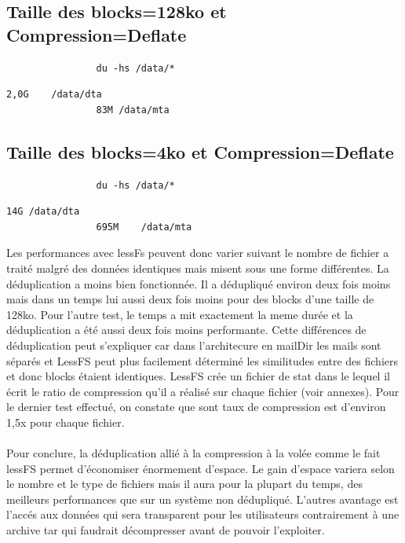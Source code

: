 \documentclass[a4paper]{report}
\begin{document}
			\subsection{Taille des blocks=128ko et Compression=Deflate}
			\begin{lstlisting}
				du -hs /data/*
			\end{lstlisting}
			\begin{lstlisting}[backgroundcolor=\color{yellow}]
				2,0G	/data/dta
				83M	/data/mta
			\end{lstlisting}
			\subsection{Taille des blocks=4ko et Compression=Deflate}
			\begin{lstlisting}
				du -hs /data/*
			\end{lstlisting}
			\begin{lstlisting}[backgroundcolor=\color{yellow}]
				14G	/data/dta
				695M	/data/mta
			\end{lstlisting}
			
			Les performances avec lessFs peuvent donc varier suivant le nombre de fichier a traité malgré des données identiques mais misent sous une forme différentes. La déduplication a moins bien fonctionnée. Il a dédupliqué environ deux fois moins mais dans un temps lui aussi deux fois moins pour des blocks d'une taille de 128ko. Pour l'autre test, le temps a mit exactement la meme durée et la déduplication a été aussi deux fois moins performante. Cette différences de déduplication peut s'expliquer car dans l'architecure en mailDir les mails sont séparés et LessFS peut plus facilement déterminé les similitudes entre des fichiers et donc blocks étaient identiques. LessFS crée un fichier de stat dans le lequel il écrit le ratio de compression qu'il a réalisé sur chaque fichier (voir annexes). Pour le  dernier test effectué, on constate que sont taux de compression est d'environ 1,5x pour chaque fichier.\\\\
			Pour conclure, la déduplication allié à la compression à la volée comme le fait lessFS permet d'économiser énormement d'espace. Le gain d'espace variera selon le nombre et le type de fichiers mais il aura pour la plupart du temps, des meilleurs performances que sur un système non dédupliqué. L'autres avantage est l'accés aux données qui sera transparent pour les utilisateurs contrairement à une archive tar qui faudrait décompresser avant de pouvoir l'exploiter.
\end{document}
